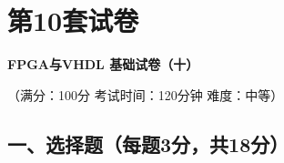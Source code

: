 \chapter{第10套试卷}

\begin{center}
\textbf{FPGA与VHDL 基础试卷（十）}

（满分：100分 \hspace{2em} 考试时间：120分钟 \hspace{2em} 难度：中等）
\end{center}

\section*{一、选择题（每题3分，共18分）}

